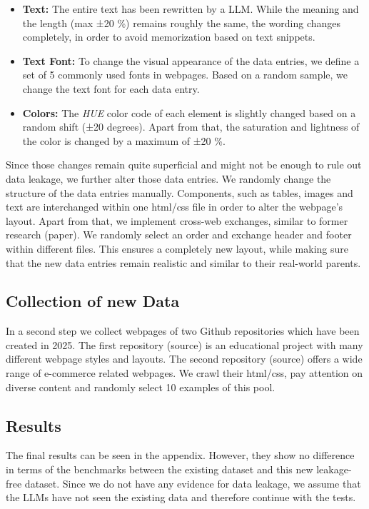 \begin{itemize}
  \item \textbf{Text:} The entire text has been rewritten by a LLM. While the meaning
    and the length (max ±20 \%) remains roughly the same, the wording changes
    completely, in order to avoid memorization based on text snippets.
  \item \textbf{Text Font:} To change the visual appearance of the data entries, we 
    define a set of 5 commonly used fonts in webpages. Based on a random sample, we 
    change the text font for each data entry.
  \item \textbf{Colors:} The \textit{HUE} color code of each element is slightly
    changed based on a random shift (±20 degrees). Apart from that, the saturation
    and lightness of the color is changed by a maximum of ±20 \%.
\end{itemize}

Since those changes remain quite superficial and might not be enough to rule out 
data leakage, we further alter those data entries. We randomly change the structure 
of the data entries manually. Components, such as tables, images and text are 
interchanged within one html/css file in order to alter the webpage's layout.
Apart from that, we implement cross-web exchanges, similar to former research (paper).
We randomly select an order and exchange header and footer within different files. 
This ensures a completely new layout, while making sure that the new data entries 
remain realistic and similar to their real-world parents.

\subsection{Collection of new Data}
In a second step we collect webpages of two Github repositories which have been 
created in 2025. The first repository (source) is an educational project 
with many different webpage styles and layouts. The second repository (source)
offers a wide range of e-commerce related webpages. \newline
We crawl their html/css, pay attention on diverse content and randomly select
10 examples of this pool.


\subsection{Results}
The final results can be seen in the appendix. However, they show no difference 
in terms of the benchmarks between the existing dataset and this new leakage-free 
dataset. Since we do not have any evidence for data leakage, we assume that the 
LLMs have not seen the existing data and therefore continue with the tests.


